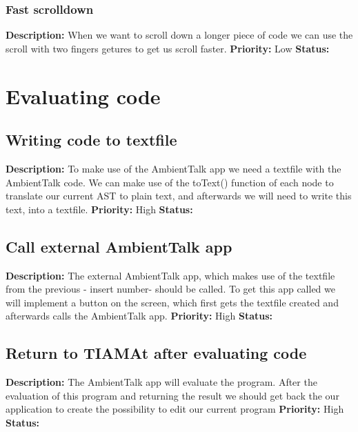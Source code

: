 \documentclass[a4paper,12pt]{report}
\begin{document}
\subsubsection{Fast scrolldown}
\textbf{Description: }When we want to scroll down a longer piece of code we can use the scroll with two fingers getures to get us scroll faster. \newline
\textbf{Priority:} Low \newline
\textbf{Status: } \newline
\section{Evaluating code}
\subsection{Writing code to textfile}
\textbf{Description: }To make use of the AmbientTalk app we need a textfile with the AmbientTalk code. We can make use of the toText() function of each node to translate our
current AST to plain text, and afterwards we will need to write this text, into a textfile.  \newline
\textbf{Priority:} High \newline
\textbf{Status: } \newline
\subsection{Call external AmbientTalk app}
\textbf{Description: }The external AmbientTalk app, which makes use of the textfile from the previous - insert number- should be called. To get this app called we will implement
a button on the screen, which first gets the textfile created and afterwards calls the AmbientTalk app. \newline
\textbf{Priority:} High \newline
\textbf{Status: } \newline
\subsection{Return to TIAMAt after evaluating code}
\textbf{Description: } The AmbientTalk app will evaluate the program. After the evaluation of this program and returning the result we should get back the our application to
create the possibility to edit our current program\newline
\textbf{Priority:} High \newline
\textbf{Status: } \newline
\end{document}
